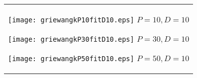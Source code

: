 \documentclass[a4paper,11pt,oneside,openany]{jsbook}
\begin{document}
\begin{figure}[htbp]
  \begin{center}
    \begin{tabular}{c}


      \begin{minipage}{0.33\hsize}
        \begin{center}
          \texttt{[image: griewangkP10fitD10.eps]}
          \hspace{1.2cm}$P=10, D=10
$        \end{center}
      \end{minipage}

      \begin{minipage}{0.33\hsize}
        \begin{center}
          \texttt{[image: griewangkP30fitD10.eps]}
          \hspace{1.2cm}$P=30, D=10
$        \end{center}
      \end{minipage}

      \begin{minipage}{0.33\hsize}
        \begin{center}
          \texttt{[image: griewangkP50fitD10.eps]}
          \hspace{1.2cm}$P=50, D=10
$        \end{center}
      \end{minipage}
    \end{tabular}
  \end{center}
\end{figure}
\end{document}
